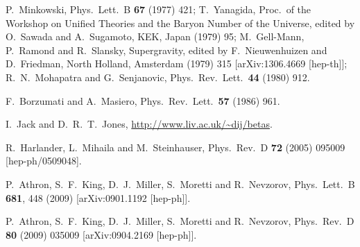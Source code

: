 \documentclass[final,3p,11pt,pdflatex]{elsarticle}
\newcommand{\ptitle}[1]{\emph{#1}}
\renewcommand{\ptitle}[1]{}
\begin{document}
\begin{thebibliography}{100}
  P.~Minkowski, \ptitle{
  $\mu \rightarrow e \gamma$ at a Rate of One Out of 1-Billion Muon Decays?,}
  Phys.\ Lett.\ B {\bf 67} (1977) 421;
  T.~Yanagida, \ptitle{
  Horizontal Symmetry And Masses Of Neutrinos,}
  Proc.\ of the
  Workshop on Unified Theories and the Baryon Number of the Universe,
  edited by O.~Sawada and A.~Sugamoto, KEK, Japan (1979) 95;
  M.~Gell-Mann, P.~Ramond and R.~Slansky, \ptitle{
  Complex Spinors and Unified Theories,}
  Supergravity, edited by F.~Nieuwenhuizen and
  D.~Friedman, North Holland, Amsterdam (1979) 315
  [arXiv:1306.4669 [hep-th]];
  R.~N.~Mohapatra and G.~Senjanovic, \ptitle{
  Neutrino Mass and Spontaneous Parity Nonconservation,}
  Phys.\ Rev.\ Lett.\  {\bf 44} (1980) 912.

  F.~Borzumati and A.~Masiero, \ptitle{
Large Muon- and electron-Number Nonconservation in Supergravity Theories,}
  Phys.\ Rev.\ Lett.\  {\bf 57} (1986) 961.

  I.~Jack and D.~R.~T.~Jones, \ptitle{
    3-loop MSSM beta functions,}
  \url{http://www.liv.ac.uk/~dij/betas}.

  R.~Harlander, L.~Mihaila and M.~Steinhauser,
  Phys.\ Rev.\ D {\bf 72} (2005) 095009
  [hep-ph/0509048].



  P.~Athron, S.~F.~King, D.~J.~Miller, S.~Moretti and R.~Nevzorov,
  Phys.\ Lett.\ B {\bf 681}, 448 (2009)
  [arXiv:0901.1192 [hep-ph]].


  P.~Athron, S.~F.~King, D.~J.~Miller, S.~Moretti and R.~Nevzorov,
  Phys.\ Rev.\ D {\bf 80} (2009) 035009
  [arXiv:0904.2169 [hep-ph]].




\end{thebibliography}
\end{document}
